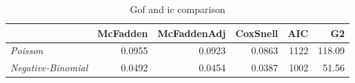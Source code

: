 \begin{wraptable}{r}{3in}

\caption{\label{tab:gof_ic_comparison}Gof and ic comparison}
\centering
\fontsize{9}{11}\selectfont
\begin{tabular}[t]{>{}lrrrrr}
\toprule
  & McFadden & McFaddenAdj & CoxSnell & AIC & G2\\
\midrule
\em{Poisson} & 0.0955 & 0.0923 & 0.0863 & 1122 & 118.09\\
\em{Negative-Binomial} & 0.0492 & 0.0454 & 0.0387 & 1002 & 51.56\\
\bottomrule
\end{tabular}
\end{wraptable}
